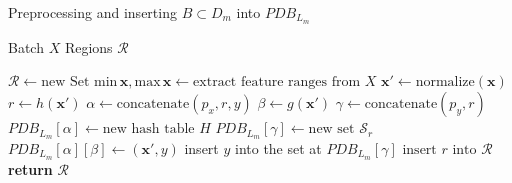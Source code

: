 \documentclass[../../main.tex]{subfiles}
\begin{document}
\begin{algorithm}
    \caption{Preprocessing and inserting $B \subset D_m$ into $PDB_{L_m}$}
    \label{alg:indexing}

    \begin{algorithmic}[1]
        \REQUIRE Batch $X$
        \ENSURE Regions $\mathcal{R}$

        \STATE $\mathcal{R} \leftarrow \text{new Set}$
        \STATE $\text{min}\,\bm{x}, \text{max}\,\bm{x} \leftarrow \text{extract feature ranges from } X$
            \STATE $\bm{x}' \leftarrow \text{normalize}(\bm{x})$ 
            \STATE $r \leftarrow h(\bm{x}')$
            \STATE $\alpha \leftarrow \text{concatenate}(p_x, r, y)$ \label{alg:indexing_kalpha}
            \STATE $\beta \leftarrow g(\bm{x}')$ \label{alg:indexing_kbeta}
            \STATE $\gamma \leftarrow \text{concatenate}(p_y,r)$ \label{alg:indexing_kgamma}
                \STATE $PDB_{L_m}[\alpha] \leftarrow \text{new hash table } H$
            \ENDIF
                \STATE $PDB_{L_m}[\gamma] \leftarrow \text{new set } \mathcal{S}_r$
            \ENDIF
            \STATE $PDB_{L_m}[\alpha][\beta] \leftarrow (\bm{x}', y)$
            \STATE insert $y$ into the set at $PDB_{L_m}[\gamma]$
            \STATE $\text{insert } r \text{ into } \mathcal{R}$
            \ENDIF         
        \ENDFOR
        \STATE \textbf{return} $\mathcal{R}$
    \end{algorithmic}
\end{algorithm}
\end{document}
